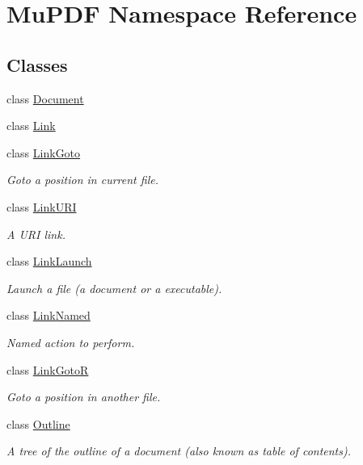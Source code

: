\hypertarget{namespace_mu_p_d_f}{\section{Mu\-P\-D\-F Namespace Reference}
\label{namespace_mu_p_d_f}
}
\subsection*{Classes}
\begin{DoxyCompactItemize}
\item 
class \hyperlink{class_mu_p_d_f_1_1_document}{Document}
\item 
class \hyperlink{class_mu_p_d_f_1_1_link}{Link}
\item 
class \hyperlink{class_mu_p_d_f_1_1_link_goto}{Link\-Goto}
\begin{DoxyCompactList}\small\item\em Goto a position in current file. \end{DoxyCompactList}\item 
class \hyperlink{class_mu_p_d_f_1_1_link_u_r_i}{Link\-U\-R\-I}
\begin{DoxyCompactList}\small\item\em A U\-R\-I link. \end{DoxyCompactList}\item 
class \hyperlink{class_mu_p_d_f_1_1_link_launch}{Link\-Launch}
\begin{DoxyCompactList}\small\item\em Launch a file (a document or a executable). \end{DoxyCompactList}\item 
class \hyperlink{class_mu_p_d_f_1_1_link_named}{Link\-Named}
\begin{DoxyCompactList}\small\item\em Named action to perform. \end{DoxyCompactList}\item 
class \hyperlink{class_mu_p_d_f_1_1_link_goto_r}{Link\-Goto\-R}
\begin{DoxyCompactList}\small\item\em Goto a position in another file. \end{DoxyCompactList}\item 
class \hyperlink{class_mu_p_d_f_1_1_outline}{Outline}
\begin{DoxyCompactList}\small\item\em A tree of the outline of a document (also known as table of contents). \end{DoxyCompactList}\item 

\end{DoxyCompactItemize}
